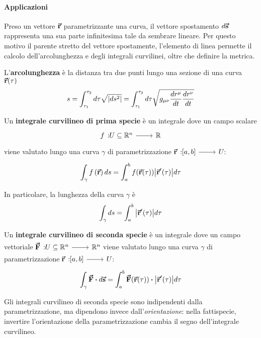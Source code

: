 \paragraph{Applicazioni}
Preso un vettore $\vb*{\va{r}}$ parametrizzante una curva, il vettore spostamento $d\vb*{\va{s}}$ rappresenta una sua parte infinitesima tale da sembrare lineare. Per questo motivo il parente stretto del vettore spostamente, l'elemento di linea permette il calcolo dell'arcolunghezza e degli integrali curvilinei, oltre che definire la metrica.
\begin{define}[Arcolunghezza]
	L'\textbf{arcolunghezza} è la distanza tra due punti lungo una sezione di una curva $\vb*{\va{r}}(\tau)$
	\begin{equation}
		s=\int_{\tau_1}^{\tau_2}d\tau\sqrt{\abs{ds^2}}=\int_{\tau_1}^{\tau_2}d\tau\sqrt{g_{\mu\nu}\frac{dr^{\mu}}{dt}\frac{dr^{\nu}}{dt}}
	\end{equation}
\end{define}
\begin{define}
Un \textbf{integrale curvilineo di prima specie} è un integrale dove un campo scalare
\begin{equation*}
	\funz[f]{U\subseteq\realset^n}{\realset}
\end{equation*}
viene valutato lungo una curva $\gamma$ di parametrizzazione $\funz[\vba{r}]{\left[a,b\right]}{U}$:
\begin{equation}
	\int_\gamma f\left(\vb*{\va{r}}\right)ds=\int_a^b f(\vb*{\va{r}}(\tau))\abs{\vb*{\va{r}}'(\tau)}d\tau
\end{equation}
\end{define}
In particolare, la lunghezza della curva $\gamma$ è
\begin{equation}
	\int_\gamma ds=\int_a^b \abs{\vb*{\va{r}}'(\tau)}d\tau
\end{equation}
\begin{define}
	Un \textbf{integrale curvilineo di seconda specie} è un integrale dove un campo vettoriale $\funz[\vba{F}]{U\subseteq\realset^n}{\realset^n}$ viene valutato lungo una curva $\gamma$ di parametrizzazione $\funz[\vba{r}]{\left[a,b\right]}{U}$:
	\begin{equation}
		\int_\gamma \vba{F}\vdot d\vba{s}=\int_a^b \vba{F}(\vba{r}(\tau))\vdot\abs{\vba{r}'(\tau)}d\tau
	\end{equation}
\end{define}
Gli integrali curvilineo di seconda specie sono indipendenti dalla parametrizzazione, ma dipendono invece dall'\textit{orientazione}: nella fattispecie, invertire l'orientazione della parametrizzazione cambia il segno dell'integrale curvilineo.%
